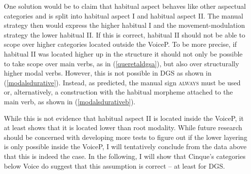 One solution would be to claim that habitual aspect behaves like other aspectual categories and is split into habitual aspect I and habitual aspect II. The manual strategy then would express the higher habitual I and the movement-modulation strategy the lower habitual II. If this is correct, habitual II should not be able to scope over higher categories located outside the VoiceP. To be more precise, if habitual II was located higher up in the structure it should not only be possible to take scope over main verbs, as in (\ref{queretaldgsa}), but also over structurally higher modal verbs. However, this is not possible in DGS as shown in (\ref{modalsdurative}). Instead, as predicted, the manual sign \textsc{always} must be used or, alternatively, a construction with the habitual morpheme  attached to the main verb, as shown in (\ref{modalsdurativeb}).

\begin{exe}
\ex\label{modalsdurative}\begin{xlist}
\end{xlist}
\end{exe}

\begin{exe}
\ex\label{modalsdurativeb}\begin{xlist}
\end{xlist}
\end{exe}

\noindent While this is not evidence that habitual aspect II is located inside the VoiceP, it at least shows that it is located lower than root modality. While future research should be concerned with developing more tests to figure out if the lower layering is only possible inside the VoiceP, I will tentatively conclude from the data above that this is indeed the case. In the following, I will show that Cinque's categories below Voice do suggest that this assumption is correct -- at least for DGS.



